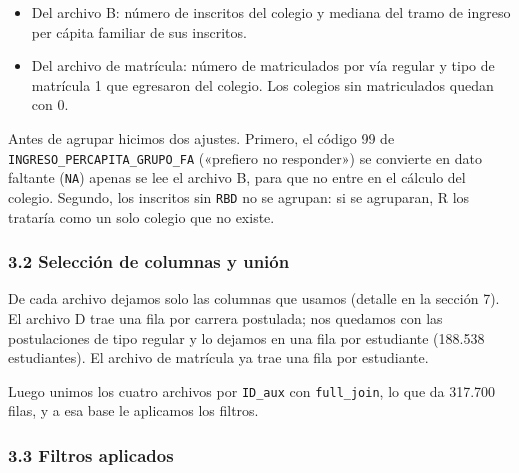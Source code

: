 \documentclass[11pt]{article}
\begin{document}
\begin{itemize}[leftmargin=1.5em, itemsep=0.3em]
  \item Del archivo B: número de inscritos del colegio y mediana del
        tramo de ingreso per cápita familiar de sus inscritos.
  \item Del archivo de matrícula: número de matriculados por vía regular y
        tipo de matrícula 1 que egresaron del colegio. Los colegios sin
        matriculados quedan con 0.
\end{itemize}

Antes de agrupar hicimos dos ajustes. Primero, el código 99 de
\texttt{INGRESO\_PERCAPITA\_GRUPO\_FA} («prefiero no responder») se
convierte en dato faltante (\texttt{NA}) apenas se lee el archivo B, para
que no entre en el cálculo del colegio. Segundo, los inscritos sin
\texttt{RBD} no se agrupan: si se agruparan, R los trataría como un solo
colegio que no existe.

\subsubsection*{3.2 \; Selección de columnas y unión}

De cada archivo dejamos solo las columnas que usamos (detalle en la
sección 7). El archivo D trae una fila por carrera postulada; nos quedamos con las
postulaciones de tipo regular y lo dejamos en una fila por estudiante
(188.538 estudiantes). El archivo de
matrícula ya trae una fila por estudiante.

Luego unimos los cuatro archivos por \texttt{ID\_aux} con
\texttt{full\_join}, lo que da 317.700 filas, y a esa base le aplicamos
los filtros.

\subsubsection*{3.3 \; Filtros aplicados}
\end{document}
